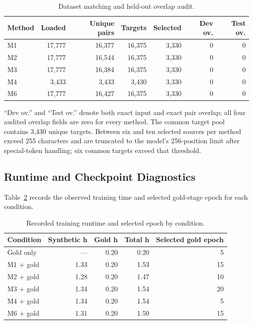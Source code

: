 \documentclass[12pt, a4paper, twoside, openany]{report}
\begin{document}
\begin{table}[H]
	\centering
	\caption{Dataset matching and held-out overlap audit.}
	\label{tab:appendix-matching-audit}
	\small
	\begin{tabular}{lrrrrrr}
		\toprule
		\textbf{Method} & \textbf{Loaded} & \textbf{Unique pairs} & \textbf{Targets} & \textbf{Selected} & \textbf{Dev ov.} & \textbf{Test ov.} \\
		\midrule
		M1 & 17,777 & 16,377 & 16,375 & 3,330 & 0 & 0 \\
		M2 & 17,777 & 16,544 & 16,375 & 3,330 & 0 & 0 \\
		M3 & 17,777 & 16,384 & 16,375 & 3,330 & 0 & 0 \\
		M4 & 3,433 & 3,433 & 3,430 & 3,330 & 0 & 0 \\
		M6 & 17,777 & 16,427 & 16,375 & 3,330 & 0 & 0 \\
		\bottomrule
	\end{tabular}
\end{table}

``Dev ov.'' and ``Test ov.'' denote both exact input and exact pair overlap; all four audited overlap fields are zero for every method. The common target pool contains 3,430 unique targets. Between six and ten selected sources per method exceed 255 characters and are truncated to the model's 256-position limit after special-token handling; six common targets exceed that threshold.

\subsection{Runtime and Checkpoint Diagnostics}

Table~\ref{tab:appendix-runtime} records the observed training time and selected gold-stage epoch for each condition.

\begin{table}[H]
	\centering
	\caption{Recorded training runtime and selected epoch by condition.}
	\label{tab:appendix-runtime}
	\small
	\begin{tabular}{lrrrr}
		\toprule
		\textbf{Condition} & \textbf{Synthetic h} & \textbf{Gold h} & \textbf{Total h} & \textbf{Selected gold epoch} \\
		\midrule
		Gold only & --- & 0.20 & 0.20 & 5 \\
		M1 + gold & 1.33 & 0.20 & 1.53 & 15 \\
		M2 + gold & 1.28 & 0.20 & 1.47 & 10 \\
		M3 + gold & 1.34 & 0.20 & 1.54 & 20 \\
		M4 + gold & 1.34 & 0.20 & 1.54 & 5 \\
		M6 + gold & 1.31 & 0.20 & 1.50 & 15 \\
		\bottomrule
	\end{tabular}
\end{table}
\end{document}
